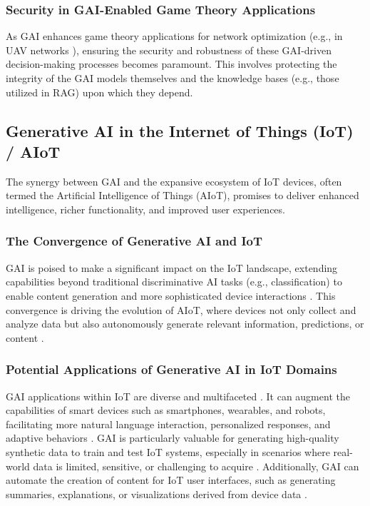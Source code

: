 \documentclass[sigconf]{acmart}
\begin{document}
\subsubsection{Security in GAI-Enabled Game Theory Applications} \label{subsubsec:gai_game_security}
As GAI enhances game theory applications for network optimization (e.g., in UAV networks \cite{ref21}), ensuring the security and robustness of these GAI-driven decision-making processes becomes paramount. This involves protecting the integrity of the GAI models themselves and the knowledge bases (e.g., those utilized in RAG) upon which they depend.

\subsection{Generative AI in the Internet of Things (IoT) / AIoT} \label{subsec:gai_iot}

The synergy between GAI and the expansive ecosystem of IoT devices, often termed the Artificial Intelligence of Things (AIoT), promises to deliver enhanced intelligence, richer functionality, and improved user experiences.

\subsubsection{The Convergence of Generative AI and IoT} \label{subsubsec:gai_iot_convergence}
GAI is poised to make a significant impact on the IoT landscape, extending capabilities beyond traditional discriminative AI tasks (e.g., classification) to enable content generation and more sophisticated device interactions \cite{ref15, ref26}. This convergence is driving the evolution of AIoT, where devices not only collect and analyze data but also autonomously generate relevant information, predictions, or content \cite{ref26}.

\subsubsection{Potential Applications of Generative AI in IoT Domains} \label{subsubsec:gai_iot_apps}
GAI applications within IoT are diverse and multifaceted \cite{ref15}. It can augment the capabilities of smart devices such as smartphones, wearables, and robots, facilitating more natural language interaction, personalized responses, and adaptive behaviors \cite{ref15}. GAI is particularly valuable for generating high-quality synthetic data to train and test IoT systems, especially in scenarios where real-world data is limited, sensitive, or challenging to acquire \cite{ref15}. Additionally, GAI can automate the creation of content for IoT user interfaces, such as generating summaries, explanations, or visualizations derived from device data \cite{ref15}.
\end{document}
